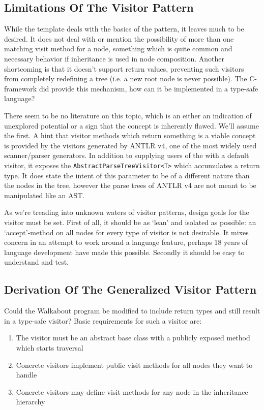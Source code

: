 \documentclass[twoside,openright]{uva-bachelor-thesis}
\newcommand{\code}[1]{\texttt{\footnotesize#1}}
\begin{document}
			
		\subsection{Limitations Of The Visitor Pattern}
			
			While the template deals with the basics of the pattern, it leaves much to be desired. It does not deal with or mention the possibility of more than one matching visit method for a node, something which is quite common and necessary behavior if inheritance is used in node composition. Another shortcoming is that it doesn't support return values, preventing such visitors from completely redefining a tree (i.e. a new root node is never possible). The C-framework did provide this mechanism, how can it be implemented in a type-safe language?
			
			There seem to be no literature on this topic, which is an either an indication of unexplored potential or a sign that the concept is inherently flawed. We'll assume the first. A hint that visitor methods which return something is a viable concept is provided by the visitors generated by ANTLR v4, one of the most widely used scanner/parser generators\cite{website:antlr4}. In addition to supplying users of the with a default visitor, it exposes the \code{AbstractParseTreeVisitor<T>} which accumulates a return type. It does state the intent of this parameter to be of a different nature than the nodes in the tree, however the parse trees of ANTLR v4 are not meant to be manipulated like an AST.
			
			As we're treading into unknown waters of visitor patterns, design goals for the visitor must be set. First of all, it should be as `lean' and isolated as possible: an `accept'-method on all nodes for every type of visitor is not desirable. It mixes concern in an attempt to work around a language feature, perhaps 18 years of language development have made this possible. Secondly it should be easy to understand and test.
			
		\subsection{Derivation Of The Generalized Visitor Pattern}
		\label{gen-vis-deriv}
			Could the Walkabout program be modified to include return types and still result in a type-safe visitor? Basic requirements for such a visitor are:
			\begin{enumerate}
				\item The visitor must be an abstract base class with a publicly exposed method which starts traversal
				\item Concrete visitors implement public visit methods for all nodes they want to handle
				\item Concrete visitors may define visit methods for any node in the inheritance hierarchy
			\end{enumerate}
			
\end{document}
